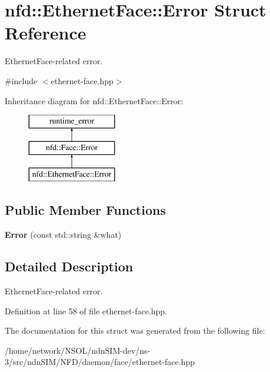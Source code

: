 \hypertarget{structnfd_1_1EthernetFace_1_1Error}{}\section{nfd\+:\+:Ethernet\+Face\+:\+:Error Struct Reference}
\label{structnfd_1_1EthernetFace_1_1Error}


Ethernet\+Face-\/related error.  




{\ttfamily \#include $<$ethernet-\/face.\+hpp$>$}

Inheritance diagram for nfd\+:\+:Ethernet\+Face\+:\+:Error\+:\begin{figure}[H]
\begin{center}
\leavevmode
\includegraphics[height=3.000000cm]{structnfd_1_1EthernetFace_1_1Error}
\end{center}
\end{figure}
\subsection*{Public Member Functions}
\begin{DoxyCompactItemize}
\item 
{\bfseries Error} (const std\+::string \&what)\hypertarget{structnfd_1_1EthernetFace_1_1Error_af8c68bc7496388b8409c35bbe5423ea0}{}\label{structnfd_1_1EthernetFace_1_1Error_af8c68bc7496388b8409c35bbe5423ea0}

\end{DoxyCompactItemize}


\subsection{Detailed Description}
Ethernet\+Face-\/related error. 

Definition at line 58 of file ethernet-\/face.\+hpp.



The documentation for this struct was generated from the following file\+:\begin{DoxyCompactItemize}
\item 
/home/network/\+N\+S\+O\+L/ndn\+S\+I\+M-\/dev/ns-\/3/src/ndn\+S\+I\+M/\+N\+F\+D/daemon/face/ethernet-\/face.\+hpp\end{DoxyCompactItemize}
